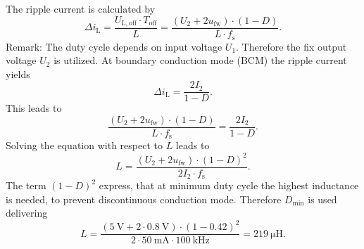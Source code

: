 \begin{solutionblock}
	The ripple current is calculated by
	\begin{equation*}
		\Delta i_\mathrm{L}=\frac{U_\mathrm{L,off} \cdot T_\mathrm{off}}{L}
		=\frac{(U_\mathrm{2}+2u_\mathrm{fw}) \cdot (1-D)}{L \cdot f_\mathrm{s}}.
	\end{equation*}
	Remark: The duty cycle depends on input voltage $U_\mathrm{1}$. Therefore the fix output voltage $U_\mathrm{2}$ is utilized.
	At boundary conduction mode (BCM) the ripple current yields
	\begin{equation*}
		\Delta i_\mathrm{L} = \frac{2 I_\mathrm{2}}{1-D}.
	\end{equation*}
	This leads to
	\begin{equation*}
		\frac{(U_\mathrm{2}+2u_\mathrm{fw}) \cdot (1-D)}{L \cdot f_\mathrm{s}} = \frac{2 I_\mathrm{2}}{1-D}.
	\end{equation*}
	Solving the equation with respect to $L$ leads to
	\begin{equation*}
		L = \frac{(U_\mathrm{2}+2u_\mathrm{fw}) \cdot (1-D)^2}{2 I_\mathrm{2} \cdot f_\mathrm{s}}.
	\end{equation*}
	The term $(1-D)^2$ express, that at minimum duty cycle the highest inductance is needed, to prevent discontinuous conduction mode.
	Therefore $D_\mathrm{min}$ is used delivering
	\begin{equation*}
		L = \frac{(\SI{5}{\volt}+2 \cdot \SI{0.8}{\volt}) \cdot (1-0.42)^2}{2 \cdot \SI{50}{\milli\ampere} \cdot \SI{100}{\kilo\hertz}}
		= \SI{219}{\micro\henry}.
	\end{equation*}

\end{solutionblock}


